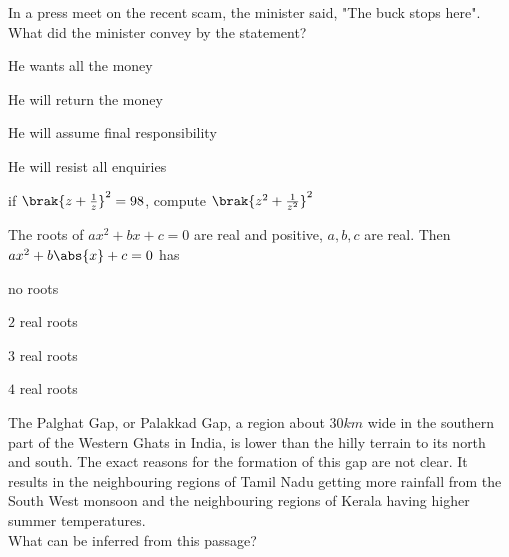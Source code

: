     \item In a press meet on the recent scam, the minister said, "The buck stops here". What did the minister convey by the statement?
        \begin{enumerate}
                \begin{multicols}{2}
                \item  He wants all the money
                    \columnbreak
                \item  He will return the money
                \end{multicols}
                \begin{multicols}{2}
                \item He will assume final responsibility
                    \columnbreak
                \item He will resist all enquiries
                \end{multicols}
        \end{enumerate}
    \item if $\brak{z+\frac{1}{z}}^2=98$, compute $\brak{z^2+\frac{1}{z^2}}^2$
    \item The roots of $ax^2+bx+c=0$ are real and positive, $a,b,c$ are real. Then $ax^2+b\abs{x}+c=0$ has
        \begin{enumerate}
                \begin{multicols}{2}
                \item no roots
                    \columnbreak
                \item $2$ real roots
                \end{multicols}
                \begin{multicols}{2}
                \item $3$ real roots
                    \columnbreak
                \item $4$ real roots
                \end{multicols}
        \end{enumerate}
    \item The Palghat Gap, or Palakkad Gap, a region about $30 km$ wide in the southern part of the Western Ghats in India, is lower than the hilly terrain to its north and south. The exact reasons for the formation of this gap are not clear. It results in the neighbouring regions of Tamil Nadu getting more rainfall from the South West monsoon and the neighbouring regions of Kerala having higher summer temperatures.\\
        What can be inferred from this passage?

